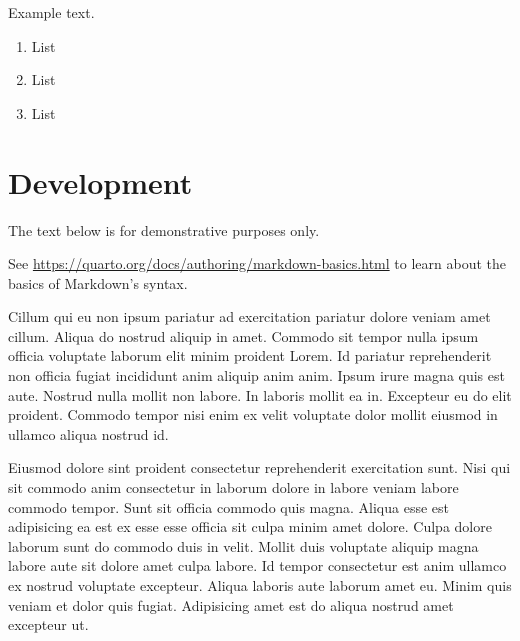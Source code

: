 \documentclass[
12pt,
openright,
oneside,
a4paper,
chapter=TITLE,
section=TITLE,
french,
spanish,
brazil,
english
]{abntex2}
\let\oldparagraph\paragraph
\renewcommand{\paragraph}[1]{\oldparagraph{#1}\mbox{}}
\let\oldsubparagraph\subparagraph
\renewcommand{\subparagraph}[1]{\oldsubparagraph{#1}\mbox{}}
\providecommand{\tightlist}{
\setlength{\itemsep}{0pt}\setlength{\parskip}{0pt}}%
\begin{document}
Example text.

\begin{enumerate}
\def\labelenumi{\arabic{enumi}.}
\tightlist
\item
  List
\item
  List
\item
  List
\end{enumerate}


\hypertarget{development}{%
\chapter{Development}\label{development}}

\begin{tcolorbox}[enhanced jigsaw, toptitle=1mm, colback=white, toprule=.15mm, opacitybacktitle=0.6, title=\textcolor{quarto-callout-warning-color}{\faExclamationTriangle}\hspace{0.5em}{Warning}, colframe=quarto-callout-warning-color-frame, titlerule=0mm, leftrule=.75mm, coltitle=black, colbacktitle=quarto-callout-warning-color!10!white, breakable, bottomrule=.15mm, arc=.35mm, rightrule=.15mm, opacityback=0, bottomtitle=1mm, left=2mm]

The text below is for demonstrative purposes only.

\vspace{5pt}

See \url{https://quarto.org/docs/authoring/markdown-basics.html} to
learn about the basics of Markdown's syntax.

\end{tcolorbox}

\vspace{10pt}

Cillum qui eu non ipsum pariatur ad exercitation pariatur dolore veniam
amet cillum. Aliqua do nostrud aliquip in amet. Commodo sit tempor nulla
ipsum officia voluptate laborum elit minim proident Lorem. Id pariatur
reprehenderit non officia fugiat incididunt anim aliquip anim anim.
Ipsum irure magna quis est aute. Nostrud nulla mollit non labore. In
laboris mollit ea in. Excepteur eu do elit proident. Commodo tempor nisi
enim ex velit voluptate dolor mollit eiusmod in ullamco aliqua nostrud
id.

Eiusmod dolore sint proident consectetur reprehenderit exercitation
sunt. Nisi qui sit commodo anim consectetur in laborum dolore in labore
veniam labore commodo tempor. Sunt sit officia commodo quis magna.
Aliqua esse est adipisicing ea est ex esse esse officia sit culpa minim
amet dolore. Culpa dolore laborum sunt do commodo duis in velit. Mollit
duis voluptate aliquip magna labore aute sit dolore amet culpa labore.
Id tempor consectetur est anim ullamco ex nostrud voluptate excepteur.
Aliqua laboris aute laborum amet eu. Minim quis veniam et dolor quis
fugiat. Adipisicing amet est do aliqua nostrud amet excepteur ut.
\end{document}
